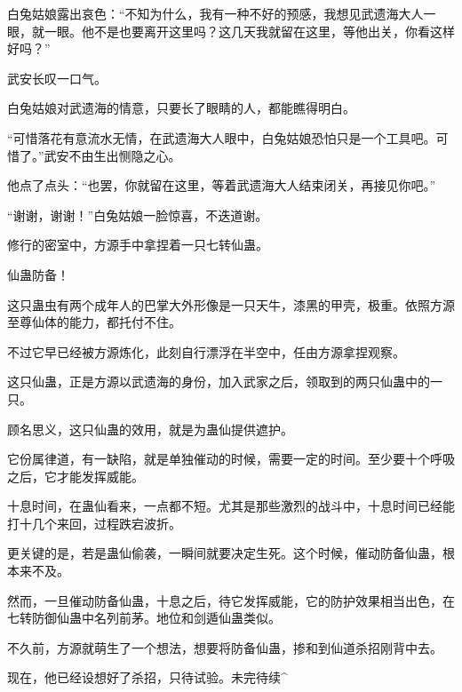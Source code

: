 \begin{this_body}
白兔姑娘露出哀色：“不知为什么，我有一种不好的预感，我想见武遗海大人一眼，就一眼。他不是也要离开这里吗？这几天我就留在这里，等他出关，你看这样好吗？”

武安长叹一口气。

白兔姑娘对武遗海的情意，只要长了眼睛的人，都能瞧得明白。

“可惜落花有意流水无情，在武遗海大人眼中，白兔姑娘恐怕只是一个工具吧。可惜了。”武安不由生出恻隐之心。

他点了点头：“也罢，你就留在这里，等着武遗海大人结束闭关，再接见你吧。”

“谢谢，谢谢！”白兔姑娘一脸惊喜，不迭道谢。

修行的密室中，方源手中拿捏着一只七转仙蛊。

仙蛊防备！

这只蛊虫有两个成年人的巴掌大外形像是一只天牛，漆黑的甲壳，极重。依照方源至尊仙体的能力，都托付不住。

不过它早已经被方源炼化，此刻自行漂浮在半空中，任由方源拿捏观察。

这只仙蛊，正是方源以武遗海的身份，加入武家之后，领取到的两只仙蛊中的一只。

顾名思义，这只仙蛊的效用，就是为蛊仙提供遮护。

它份属律道，有一缺陷，就是单独催动的时候，需要一定的时间。至少要十个呼吸之后，它才能发挥威能。

十息时间，在蛊仙看来，一点都不短。尤其是那些激烈的战斗中，十息时间已经能打十几个来回，过程跌宕波折。

更关键的是，若是蛊仙偷袭，一瞬间就要决定生死。这个时候，催动防备仙蛊，根本来不及。

然而，一旦催动防备仙蛊，十息之后，待它发挥威能，它的防护效果相当出色，在七转防御仙蛊中名列前茅。地位和剑遁仙蛊类似。

不久前，方源就萌生了一个想法，想要将防备仙蛊，掺和到仙道杀招刚背中去。

现在，他已经设想好了杀招，只待试验。未完待续\^{}

\end{this_body}

